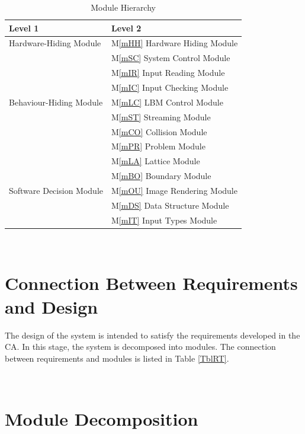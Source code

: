 \documentclass[12pt, titlepage]{article}
\newcommand{\mref}[1]{M\ref{#1}}
\begin{document}
\begin{table}[h!]
\centering
\begin{tabular}{p{} p{}}
\toprule
\textbf{Level 1} & \textbf{Level 2}\\
\midrule

{Hardware-Hiding Module}
& \mref{mHH} Hardware Hiding Module\\
\midrule

\multirow{7}{0.3\textwidth}{Behaviour-Hiding Module}
& \mref{mSC} System Control Module\\
& \mref{mIR} Input Reading Module\\
& \mref{mIC} Input Checking Module\\
& \mref{mLC} LBM Control Module\\
& \mref{mST} Streaming Module\\
& \mref{mCO} Collision Module\\ 
& \mref{mPR} Problem Module\\
& \mref{mLA} Lattice Module\\
& \mref{mBO} Boundary Module\\
\midrule

\multirow{1}{0.3\textwidth}{Software Decision Module}
& \mref{mOU} Image Rendering Module\\
& \mref{mDS} Data Structure Module\\
& \mref{mIT} Input Types Module\\
\bottomrule

\end{tabular}
\caption{Module Hierarchy}
\label{TblMH}
\end{table}

~\newpage

\section{Connection Between Requirements and Design} \label{SecConnection}

The design of the system is intended to satisfy the requirements developed in
the CA. In this stage, the system is decomposed into modules. The connection
between requirements and modules is listed in Table \ref{TblRT}.

~\newpage

\section{Module Decomposition} \label{SecMD}
\end{document}

